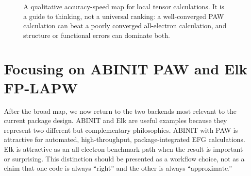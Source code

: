 \documentclass[11pt]{article}
\begin{document}
\begin{figure}[H]
\centering
{}
\caption{A qualitative accuracy-speed map for local tensor calculations.  It is a guide to thinking, not a universal ranking: a well-converged PAW calculation can beat a poorly converged all-electron calculation, and structure or functional errors can dominate both.}
\label{fig:methodmap}
\end{figure}

\section{Focusing on ABINIT PAW and Elk FP-LAPW}

After the broad map, we now return to the two backends most relevant to the current package design.  ABINIT and Elk are useful examples because they represent two different but complementary philosophies.  ABINIT with PAW is attractive for automated, high-throughput, package-integrated EFG calculations.  Elk is attractive as an all-electron benchmark path when the result is important or surprising.  This distinction should be presented as a workflow choice, not as a claim that one code is always ``right'' and the other is always ``approximate.''
\end{document}

